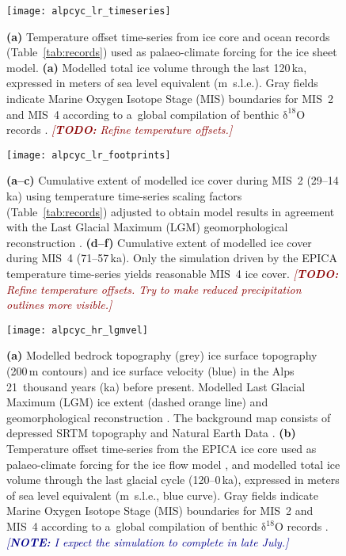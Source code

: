 \documentclass{article}
\newcommand{\note}[1]{\textcolor{darkblue}{\emph{[\textbf{NOTE:} #1]}}}
\newcommand{\todo}[1]{\textcolor{darkred}{\emph{[\textbf{TODO:} #1]}}}
\newcommand{\chem}[1]{\ensuremath{\mathrm{#1}}}
\begin{document}
    \begin{figure}
      \centerline{\texttt{[image: alpcyc\_lr\_timeseries]}}
      \caption{%
        \textbf{(a)} Temperature offset time-series from ice core and ocean
        records (Table~\ref{tab:records}) used as palaeo-climate forcing for
        the ice sheet model.
        \textbf{(a)} Modelled total ice volume through the last 120\,ka,
        expressed in meters of sea level equivalent (m~s.l.e.). Gray fields
        indicate Marine Oxygen Isotope Stage (MIS) boundaries for MIS~2 and
        MIS~4 according to a~global compilation of benthic \chem{\delta^{18}O}
        records \citep{Lisiecki.Raymo.2005}.
        \todo{Refine temperature offsets.}}
      \label{fig:timeseries}
    \end{figure}

    \begin{figure}
      \centerline{\texttt{[image: alpcyc\_lr\_footprints]}}
      \caption{%
        \textbf{(a--c)} Cumulative extent of modelled ice cover during MIS~2
        (29--14\,ka) using temperature time-series scaling factors
        (Table~\ref{tab:records}) adjusted to obtain model results in agreement
        with the Last Glacial Maximum (LGM) geomorphological reconstruction
        \citep[solid red line,][]{Ehlers.etal.2011}.
        \textbf{(d--f)} Cumulative extent of modelled ice cover during MIS~4
        (71--57\,ka). Only the simulation driven by the EPICA temperature
        time-series yields reasonable MIS~4 ice cover.
        \todo{Refine temperature offsets. Try to make reduced precipitation
              outlines more visible.}}
      \label{fig:footprints}
    \end{figure}

    \begin{figure}
      \centerline{\texttt{[image: alpcyc\_hr\_lgmvel]}}
      \caption{%
        \textbf{(a)} Modelled bedrock topography (grey) ice surface topography
        (200\,m contours) and ice surface velocity (blue) in the Alps
        21~thousand years (ka) before present. Modelled Last Glacial Maximum
        (LGM) ice extent (dashed orange line) and geomorphological
        reconstruction \citep[solid red line,][]{Ehlers.etal.2011}. The
        background map consists of depressed SRTM \citep{Jarvis.etal.2008}
        topography and Natural Earth Data \citep{Patterson.Kelso.2017}.
        \textbf{(b)} Temperature offset time-series from the EPICA ice core
        used as palaeo-climate forcing for the ice flow model \citep[black
        curve,][]{Jouzel.etal.2007}, and modelled total ice volume through the
        last glacial cycle (120--0\,ka), expressed in meters of sea level
        equivalent (m~s.l.e., blue curve). Gray fields indicate Marine
        Oxygen Isotope Stage (MIS) boundaries for MIS~2 and MIS~4 according to
        a~global compilation of benthic \chem{\delta^{18}O} records
        \citep{Lisiecki.Raymo.2005}.
        \note{I expect the simulation to complete in late July.}}
      \label{fig:lgmvel}
    \end{figure}
\end{document}

